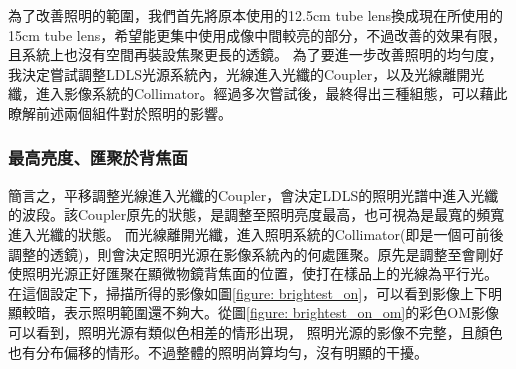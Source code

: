 \documentclass[12pt]{article}
\begin{document}
為了改善照明的範圍，我們首先將原本使用的12.5cm tube lens換成現在所使用的15cm tube lens，希望能更集中使用成像中間較亮的部分，不過改善的效果有限，且系統上也沒有空間再裝設焦聚更長的透鏡。
為了要進一步改善照明的均勻度，我決定嘗試調整LDLS光源系統內，光線進入光纖的Coupler，以及光線離開光纖，進入影像系統的Collimator。經過多次嘗試後，最終得出三種組態，可以藉此瞭解前述兩個組件對於照明的影響。
\subsubsection{最高亮度、匯聚於背焦面} \label{section: illuOriginal}
簡言之，平移調整光線進入光纖的Coupler，會決定LDLS的照明光譜中進入光纖的波段。該Coupler原先的狀態，是調整至照明亮度最高，也可視為是最寬的頻寬進入光纖的狀態。
而光線離開光纖，進入照明系統的Collimator(即是一個可前後調整的透鏡)，則會決定照明光源在影像系統內的何處匯聚。原先是調整至會剛好使照明光源正好匯聚在顯微物鏡背焦面的位置，使打在樣品上的光線為平行光。
在這個設定下，掃描所得的影像如圖\ref{figure: brightest_on}，可以看到影像上下明顯較暗，表示照明範圍還不夠大。從圖\ref{figure: brightest_on_om}的彩色OM影像可以看到，照明光源有類似色相差的情形出現，
照明光源的影像不完整，且顏色也有分布偏移的情形。不過整體的照明尚算均勻，沒有明顯的干擾。
\end{document}
